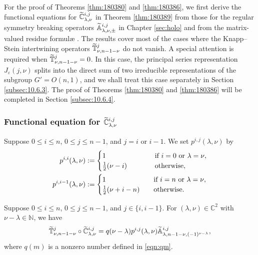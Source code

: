 For the proof of Theorems \ref{thm:180380} and \ref{thm:180386}, 
 we first derive
 the functional equations for $\widetilde{{\mathbb{C}}}_{{\lambda},{\nu}}^{{i,j}}$
 in Theorem \ref{thm:180389} from those
 for the regular symmetry breaking operators
 ${\widetilde{\mathbb{A}}}_{{\lambda},{\nu},{\pm}}^{{i,j}}$
 in Chapter \ref{sec:holo}
 and from the matrix-valued residue formul{\ae} \cite{xkresidue}.  
The results cover most of the cases
 where the Knapp--Stein intertwining operators
 $\widetilde{{\mathbb{T}}}_{{\nu},{n-1-\nu}}^{{j}}$ do not vanish.  
A special attention is required
 when $\widetilde{{\mathbb{T}}}_{{\nu},{n-1-\nu}}^{{j}}=0$.  
In this case,
 the principal series representation $J_{\varepsilon}(j,\nu)$ splits into the direct sum
 of two irreducible representations
 of the subgroup $G'=O(n,1)$, 
 and we shall treat this case separately 
 in Section \ref{subsec:10.6.3}.  
The proof of Theorems \ref{thm:180380} and \ref{thm:180386} will be completed 
 in Section \ref{subsec:10.6.4}.  

\subsubsection{Functional equation for $\widetilde{{\mathbb{C}}}_{{\lambda},{\nu}}^{{i,j}}$}
Suppose $0 \le i \le n$, 
 $0 \le j \le n-1$,
 and $j=i$ or $i-1$.  
We set $p^{i,j}(\lambda,\nu)$ by 
\begin{align}
\label{eqn:pijlmdnu}
p^{i,i}(\lambda,\nu)
&:=
\begin{cases}
1 
&\text{if $i=0$ or $\lambda = \nu$}, 
\\
\frac 1 2(\nu-i)
\qquad\quad
&\text{otherwise}, 
\end{cases}
\\
\notag
p^{i,i-1}(\lambda,\nu)
&:=
\begin{cases}
1 
\quad
&\text{if $i=n$ or $\lambda = \nu$}, 
\\
\frac 1 2(\nu+i-n)
\quad
&\text{otherwise}.  
\end{cases}
\end{align}

\begin{theorem}
\label{thm:180389}
Suppose $0 \le i \le n$, 
 $0 \le j \le n-1$, 
 and $j \in \{i,i-1\}$.  
For $(\lambda, \nu) \in {\mathbb{C}}^2$
 with $\nu-\lambda \in {\mathbb{N}}$, 
 we have
\begin{equation}
\label{eqn:180389}
  \widetilde{{\mathbb{T}}}_{{\nu},{n-1-\nu}}^{{j}} \circ \widetilde{{\mathbb{C}}}_{{\lambda},{\nu}}^{{i,j}}
=
  q(\nu-\lambda) p^{i,j}(\lambda,\nu) {\widetilde{\mathbb{A}}}_{{\lambda},{n-1-\nu},{(-1)^{\nu-\lambda}}}^{{i,j}}, 
\end{equation}
 where 
 $q(m)$ is a nonzero number defined in \eqref{eqn:qm}.  
\end{theorem}

